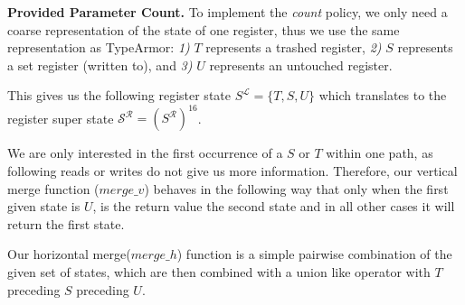 \textbf{Provided Parameter Count.}
\label{subsection:providedparamcount}
To implement the \emph{count} policy, we only need a coarse representation of the state of one register, 
thus we use the same representation as TypeArmor:
\textit{1)} $T$ represents a trashed register,
\textit{2)} $S$ represents a set register (written to), and
\textit{3)} $U$ represents an untouched register.

This gives us the following register state $S^\mathcal{L} = \{ T, S, U \}$ which translates to the register super state $\mathcal{S}^\mathcal{R} = (S^\mathcal{R})^{16}$.

We are only interested in the first occurrence of a $S$ or $T$ within one path, as following reads or writes do not give us more information. 
Therefore, our vertical merge function ($merge\_v$) behaves in the following way that only when the first given state is $U$, is the return value the 
second state and in all other cases it will return the first state.
%


Our horizontal merge($merge\_h$) function is a simple pairwise combination of the given set of states, which are then combined with a union 
like operator with $T$ preceding $S$ preceding $U$.
%
%

